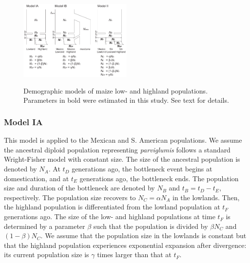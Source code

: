 \begin{figure}[tb]   
  \begin{center}
   \vspace{-0mm}
   \includegraphics[width=0.5\textwidth]{fig/Fig3}
   \renewcommand{\baselinestretch}{0.9}
   \vspace{-3mm}
   \caption{ Demographic models of maize low- and highland populations.  Parameters in bold were estimated in this study.  See text for details.
   }
\vspace{-6mm}
    \label{model}
  \end{center}
\end{figure}

\subsubsection{Model IA}
This model is applied to the Mexican and S. American populations.
We assume the ancestral diploid population representing \emph{parviglumis} follows a standard Wright-Fisher model with constant size.  
The size of the ancestral population is denoted by $N_A$.
At $t_D$ generations ago, the bottleneck event begins at domestication, and at $t_E$ generations ago, the bottleneck ends.  
The population size and duration of the bottleneck are denoted by $N_B$ and $t_B=t_D-t_E$, respectively.  
The population size recovers to $N_C=\alpha N_A$ in the lowlands.  
Then, the highland population is differentiated from the lowland population at $t_F$ generations ago.  
The size of the low- and highland populations at time $t_F$ is determined by a parameter $\beta$ such that the population is divided by $\beta N_C$ and $(1-\beta)N_C$.  
We assume that the population size in the lowlands is constant but that the highland population experiences exponential expansion after divergence: its current population size is $\gamma$ times larger than that at $t_F$. \\

